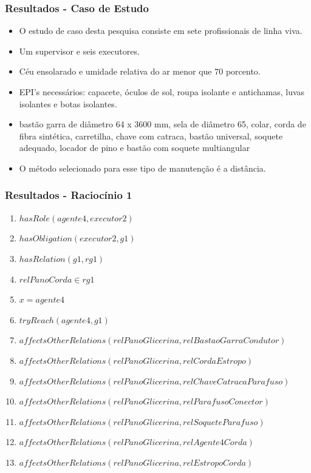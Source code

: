 \documentclass{beamer}
\begin{document}
\begin{frame}
	\frametitle{Resultados - Caso de Estudo}
	\begin{itemize}
		\item O estudo de caso desta pesquisa consiste em sete profissionais de linha viva.
		\item Um supervisor e seis executores.
		\item Céu ensolarado e umidade relativa do ar menor que 70 porcento.
		\item EPI's necessários: capacete, óculos de sol, roupa isolante e antichamas, luvas isolantes e botas isolantes.
		\item  bastão garra de diâmetro 64 x 3600 mm, sela de diâmetro 65, colar, corda de fibra sintética, carretilha, chave com catraca, bastão universal, soquete adequado, locador de pino e bastão com soquete multiangular
		\item O método selecionado para esse tipo de manutenção é a distância.
	\end{itemize}
\end{frame}
\begin{frame}
	\frametitle{Resultados - Raciocínio 1}
	\begin{enumerate}
		\item $hasRole(agente4,executor2)$ 
		\item $hasObligation(executor2,g1)$
		\item $hasRelation(g1,rg1)$ 
		\item $relPanoCorda \in rg1$
		\item $ x = agente4 $
		\item $tryReach(agente4,g1)$
		\item $affectsOtherRelations(relPanoGlicerina,relBastaoGarraCondutor)$
		\item $affectsOtherRelations(relPanoGlicerina,relCordaEstropo)$  
		\item $affectsOtherRelations(relPanoGlicerina,relChaveCatracaParafuso)$
		\item $affectsOtherRelations(relPanoGlicerina,relParafusoConector)$ 
		\item $affectsOtherRelations(relPanoGlicerina,relSoqueteParafuso)$ 
		\item $affectsOtherRelations(relPanoGlicerina,relAgente4Corda)$ 
		\item $affectsOtherRelations(relPanoGlicerina,relEstropoCorda)$	
	\end{enumerate}
\end{frame}
\end{document}
